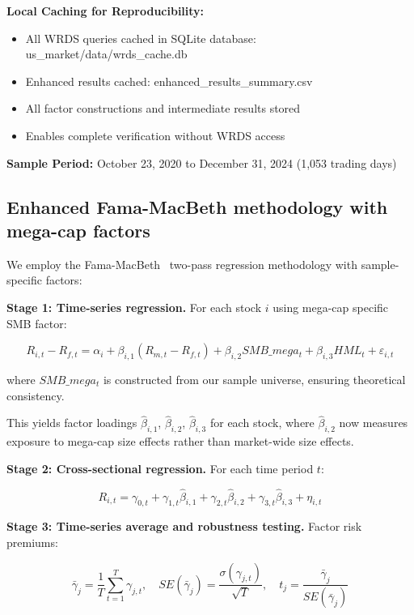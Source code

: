 \documentclass[10pt,letterpaper]{article}
\begin{document}
\textbf{Local Caching for Reproducibility:}
\begin{itemize}
\item All WRDS queries cached in SQLite database: us\_market/data/wrds\_cache.db
\item Enhanced results cached: enhanced\_results\_summary.csv
\item All factor constructions and intermediate results stored
\item Enables complete verification without WRDS access
\end{itemize}

\textbf{Sample Period:} October 23, 2020 to December 31, 2024 (1,053 trading days)

\subsection*{Enhanced Fama-MacBeth methodology with mega-cap factors}

We employ the Fama-MacBeth~\cite{fama1973} two-pass regression methodology with sample-specific factors:

\textbf{Stage 1: Time-series regression.} For each stock $i$ using mega-cap specific SMB factor:

\begin{equation}
R_{i,t} - R_{f,t} = \alpha_i + \beta_{i,1}(R_{m,t} - R_{f,t}) + \beta_{i,2}SMB\_mega_t + \beta_{i,3}HML_t + \varepsilon_{i,t}
\label{eq:stage1}
\end{equation}

where $SMB\_mega_t$ is constructed from our sample universe, ensuring theoretical consistency.

This yields factor loadings $\hat{\beta}_{i,1}$, $\hat{\beta}_{i,2}$, $\hat{\beta}_{i,3}$ for each stock, where $\hat{\beta}_{i,2}$ now measures exposure to mega-cap size effects rather than market-wide size effects.

\textbf{Stage 2: Cross-sectional regression.} For each time period $t$:

\begin{equation}
R_{i,t} = \gamma_{0,t} + \gamma_{1,t}\hat{\beta}_{i,1} + \gamma_{2,t}\hat{\beta}_{i,2} + \gamma_{3,t}\hat{\beta}_{i,3} + \eta_{i,t}
\label{eq:stage2}
\end{equation}

\textbf{Stage 3: Time-series average and robustness testing.} Factor risk premiums:

\begin{equation}
\bar{\gamma}_j = \frac{1}{T}\sum_{t=1}^{T}\gamma_{j,t}, \quad SE(\bar{\gamma}_j) = \frac{\sigma(\gamma_{j,t})}{\sqrt{T}}, \quad t_j = \frac{\bar{\gamma}_j}{SE(\bar{\gamma}_j)}
\label{eq:stage3}
\end{equation}
\end{document}
